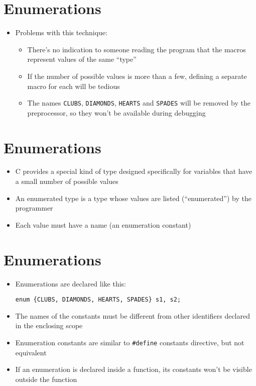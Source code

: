 \documentclass{article}
\begin{document}
\section{Enumerations}
\begin{itemize}
\item Problems with this technique:
\begin{itemize}
\item There's no indication to someone reading the program that the macros represent values of the same ``type''

\item If the number of possible values is more than a few, defining a separate macro for each will be tedious

\item The names \verb!CLUBS!, \verb!DIAMONDS!, \verb!HEARTS! and \verb!SPADES! will be removed by the preprocessor, so they won't be available during debugging
\end{itemize}
\end{itemize}



\section{Enumerations}
\begin{itemize}
\item C provides a special kind of type designed specifically for variables that have a small number of possible values

\item An enumerated type is a type whose values are listed (``enumerated'') by the programmer

\item Each value must have a name (an enumeration constant)
\end{itemize}



\section{Enumerations}
\begin{itemize}
\item Enumerations are declared like this:
\begin{verbatim}
enum {CLUBS, DIAMONDS, HEARTS, SPADES} s1, s2;
\end{verbatim}
\item The names of the constants must  be different from other identifiers declared in the enclosing scope
\item Enumeration constants are similar to \verb!#define! constants directive, but not equivalent
\item If an enumeration is declared inside a function, its constants won't be visible outside the function
\end{itemize}
\end{document}
